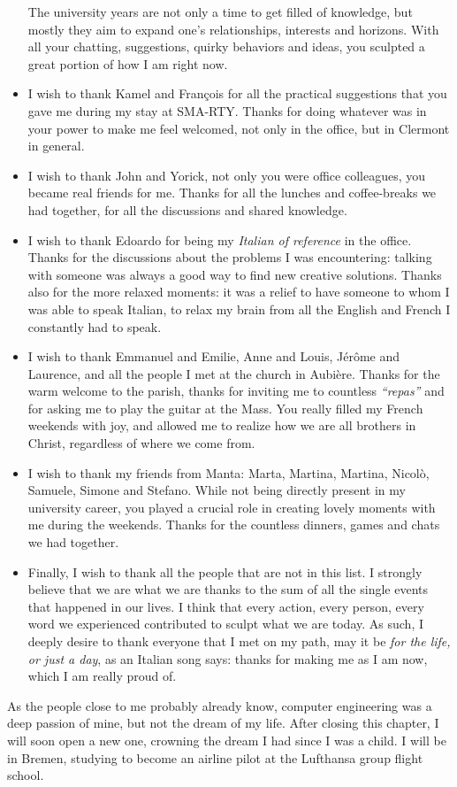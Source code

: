 \begin{itemize}
	      The university years are not only a time to get filled of knowledge, but mostly they aim to expand one's relationships, interests and horizons.
	      With all your chatting, suggestions, quirky behaviors and ideas, you sculpted a great portion of how I am right now.\ackspacebullet
	\item I wish to thank Kamel and François for all the practical suggestions that you gave me during my stay at SMA-RTY.
	      Thanks for doing whatever was in your power to make me feel welcomed, not only in the office, but in Clermont in general.\ackspacebullet
	\item I wish to thank John and Yorick, not only you were office colleagues, you became real friends for me.
	      Thanks for all the lunches and coffee-breaks we had together, for all the discussions and shared knowledge.\ackspacebullet
	\item I wish to thank Edoardo for being my \textit{Italian of reference} in the office.
	      Thanks for the discussions about the problems I was encountering: talking with someone was always a good way to find new creative solutions.
	      Thanks also for the more relaxed moments: it was a relief to have someone to whom I was able to speak Italian, to relax my brain from all the English and French I constantly had to speak.\ackspacebullet
	\item I wish to thank Emmanuel and Emilie, Anne and Louis, Jérôme and Laurence, and all the people I met at the church in Aubière.
	      Thanks for the warm welcome to the parish, thanks for inviting me to countless \textit{``repas''} and for asking me to play the guitar at the Mass.
	      You really filled my French weekends with joy, and allowed me to realize how we are all brothers in Christ, regardless of where we come from.\ackspacebullet
	\item I wish to thank my friends from Manta: Marta, Martina, Martina, Nicolò, Samuele, Simone and Stefano.
	      While not being directly present in my university career, you played a crucial role in creating lovely moments with me during the weekends.
	      Thanks for the countless dinners, games and chats we had together.\ackspacebullet
	\item Finally, I wish to thank all the people that are not in this list.
	      I strongly believe that we are what we are thanks to the sum of all the single events that happened in our lives.
	      I think that every action, every person, every word we experienced contributed to sculpt what we are today.
	      As such, I deeply desire to thank everyone that I met on my path, may it be \textit{for the life, or just a day}, as an Italian song says: thanks for making me as I am now, which I am really proud of.\ackspacebullet
\end{itemize}
As the people close to me probably already know, computer engineering was a deep passion of mine, but not the dream of my life.
After closing this chapter, I will soon open a new one, crowning the dream I had since I was a child.
I will be in Bremen, studying to become an airline pilot at the Lufthansa group flight school.\ackspace

